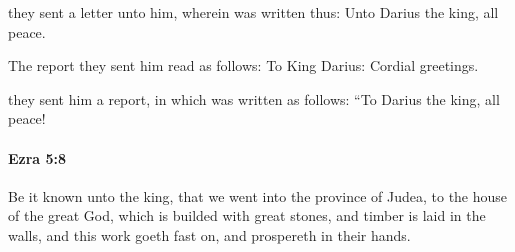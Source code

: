 			\begin{versebox}
					\item[BHS] 
					\item[LXX] 
					\item[ASV] they sent a letter unto him, wherein was written thus: Unto Darius the king, all peace.
					\item[NIV] The report they sent him read as follows: To King Darius: Cordial greetings.
					\item[NRSV] they sent him a report, in which was written as follows: “To Darius the king, all peace!
			\end{versebox}

		\paragraph{Ezra 5:8} %
			\label{EZRA-5-8}

			Be it known unto the king, that we went into the province of Judea, to the house of the great God, which is builded with great stones, and timber is laid in the walls, and this work goeth fast on, and prospereth in their hands.

